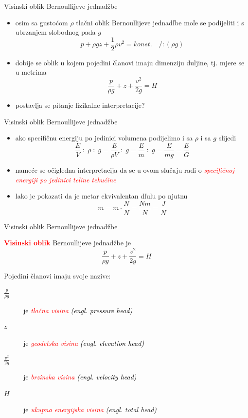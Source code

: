 \documentclass[croatian]{beamer}
\begin{document}
\begin{frame}{Visinski oblik Bernoullijeve jednadžbe}

\begin{itemize}
\item osim sa gustoćom $\rho$ tlačni oblik Bernoullijeve jednadľbe moľe
se podijeliti i s ubrzanjem slobodnog pada $g$ 
\[
p+\rho gz+\frac{1}{2}\rho v^{2}=konst.\quad/:(\rho g)
\]
\item dobije se oblik u kojem pojedini članovi imaju dimenziju duljine,
tj. mjere se u metrima
\[
\frac{p}{\rho g}+z+\frac{v^{2}}{2g}=H
\]
\item postavlja se pitanje fizikalne interpretacije?
\end{itemize}
\end{frame}

\begin{frame}{Visinski oblik Bernoullijeve jednadžbe}

\begin{itemize}
\item ako specifičnu energiju po jedinici volumena podijelimo i sa $\rho$
i sa $g$ slijedi
\[
\frac{E}{V}\;:\;\rho\;:\;g=\frac{E}{\rho V}\;:\;g=\frac{E}{m}\;:\;g=\frac{E}{mg}=\frac{E}{G}
\]
\item nameće se očigledna interpretacija da se u ovom slučaju radi o \textcolor{red}{\emph{specifičnoj
energiji po jedinici teľine tekućine}}
\item lako je pokazati da je metar ekvivalentan dľulu po njutnu
\[
m=m\cdot\frac{N}{N}=\frac{Nm}{N}=\frac{J}{N}
\]
\end{itemize}
\end{frame}

\begin{frame}{Visinski oblik Bernoullijeve jednadžbe}

\textbf{\textcolor{red}{Visinski oblik}} Bernoullijeve jednadžbe je
\[
\frac{p}{\rho g}+z+\frac{v^{2}}{2g}=H
\]
\begin{block}{Pojedini članovi imaju svoje nazive:}
\begin{description}
\item [{$\frac{p}{\rho g}$}] je\textcolor{red}{\emph{ tlačna visina }}\textcolor{black}{\emph{(engl.
pressure head)}}
\item [{$z$}] je \textcolor{red}{\emph{geodetska visina }}\textcolor{black}{\emph{(engl.
elevation head)}}
\item [{$\frac{v^{2}}{2g}$}] je \textcolor{red}{\emph{brzinska visina
}}\textcolor{black}{\emph{(engl. velocity head)}}
\item [{$H$}] je \textcolor{red}{\emph{ukupna energijska visina}} \emph{(engl.
total head)}
\end{description}
\end{block}
\end{frame}
\end{document}
